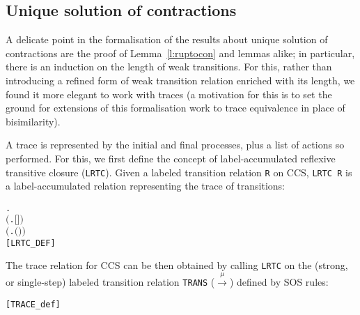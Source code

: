 \subsection{Unique solution of contractions}

A delicate point in the formalisation of the results about unique solution of
contractions are the proof of Lemma~\ref{l:ruptocon} and lemmas alike;
in particular, there is
 an induction on the length of weak transitions. 
For this, rather than 
 introducing a refined form of weak transition relation
enriched with its length, 
we found it more elegant  to  work with traces
(a motivation for this is to set the ground for extensions of this
formalisation work to trace equivalence in place of bisimilarity).



A trace is represented by the initial and final processes, plus
a list of actions  so performed.
For this, we first 
 define the concept of label-accumulated reflexive transitive closure
 (\texttt{LRTC}).
Given a labeled transition relation \texttt{R} on CCS, \texttt{LRTC R} is
a label-accumulated relation representing the trace of transitions:
\begin{alltt}
        \HOLSymConst{\HOLTokenDefEquality{}}
     \HOLSymConst{\HOLTokenForall{}}.
         \ensuremath{(}\HOLSymConst{\HOLTokenForall{}}.   \ensuremath{[}\ensuremath{]} \ensuremath{)} \HOLSymConst{\HOLTokenConj{}}
         \ensuremath{(}\HOLSymConst{\HOLTokenForall{}}    .     \HOLSymConst{\HOLTokenConj{}}     \HOLSymConst{\HOLTokenImp{}}   \ensuremath{(}\HOLSymConst{::}\ensuremath{)} \ensuremath{)} \HOLSymConst{\HOLTokenImp{}}
            \hfill{[LRTC_DEF]}
\end{alltt}
The trace relation for CCS can be then obtained
 by calling \texttt{LRTC} on the (strong, or single-step) labeled transition
 relation \texttt{TRANS} ($\overset{\mu}{\rightarrow}$) defined by SOS rules:
\begin{alltt}
    \HOLSymConst{\HOLTokenDefEquality{}}  \hfill{[TRACE_def]}
\end{alltt}

